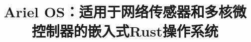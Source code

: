 
\newcommand{\OSname}{Ariel~OS}
\newcommand{\espcthree}{ESP32\nobreakdash-C3}
\newcommand{\espsthree}{ESP32\nobreakdash-S3}
\newcommand\noteEB[1]{\textcolor{red}{EB: #1}}
\newcommand\noteEF[1]{\textcolor{blue}{EF: #1}}
\newcommand\noteKS[1]{\textcolor{brown}{KS: #1}}
\newcommand\noteKZ[1]{\textcolor{navy}{KZ: #1}}
\newcommand\noteCA[1]{\textcolor{gray}{CA: #1}}
\begin{translation}
\label{cha:translation}

\title{Ariel OS：适用于网络传感器和多核微控制器的嵌入式Rust操作系统}
\maketitle

\begin{abstract}

\end{abstract}















% 
% 






\end{translation}

